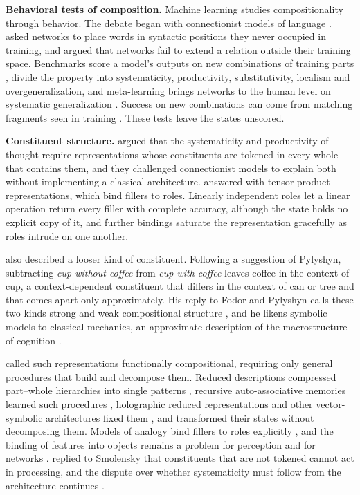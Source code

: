 \documentclass[10pt]{article}
\theoremstyle{plain}
\theoremstyle{remark}
\begin{document}
\textbf{Behavioral tests of composition.} Machine learning studies compositionality through behavior. The debate began with connectionist models of language \citep{rumelhart1986,pinker1988,elman1990}. \citet{hadley1994} asked networks to place words in syntactic positions they never occupied in training, and \citet{marcus1998} argued that networks fail to extend a relation outside their training space. Benchmarks score a model's outputs on new combinations of training parts \citep{lake2018,keysers2020}, \citet{hupkes2020} divide the property into systematicity, productivity, substitutivity, localism and overgeneralization, and meta-learning brings networks to the human level on systematic generalization \citep{lake2023}. Success on new combinations can come from matching fragments seen in training \citep{dziri2023}. These tests leave the states unscored.

\textbf{Constituent structure.} \citet{fodor1988} argued that the systematicity and productivity of thought require representations whose constituents are tokened in every whole that contains them, and they challenged connectionist models to explain both without implementing a classical architecture. \citet{smolensky1990} answered with tensor-product representations, which bind fillers to roles. Linearly independent roles let a linear operation return every filler with complete accuracy, although the state holds no explicit copy of it, and further bindings saturate the representation gracefully as roles intrude on one another.

\citet{smolensky1988} also described a looser kind of constituent. Following a suggestion of Pylyshyn, subtracting \emph{cup without coffee} from \emph{cup with coffee} leaves coffee in the context of cup, a context-dependent constituent that differs in the context of can or tree and that comes apart only approximately. His reply to Fodor and Pylyshyn calls these two kinds strong and weak compositional structure \citep{smolensky1987}, and he likens symbolic models to classical mechanics, an approximate description of the macrostructure of cognition \citep{smolensky1988}.

\citet{vangelder1990} called such representations functionally compositional, requiring only general procedures that build and decompose them. Reduced descriptions compressed part--whole hierarchies into single patterns \citep{hinton1990}, recursive auto-associative memories learned such procedures \citep{pollack1990}, holographic reduced representations and other vector-symbolic architectures fixed them \citep{plate1995,gayler2006,kanerva2009}, and \citet{chalmers1990} transformed their states without decomposing them. Models of analogy bind fillers to roles explicitly \citep{hummel1997}, and the binding of features into objects remains a problem for perception and for networks \citep{treisman1980,greff2020}. \citet{fodor1990} replied to Smolensky that constituents that are not tokened cannot act in processing, and the dispute over whether systematicity must follow from the architecture continues \citep{goodale2026}.
\end{document}
